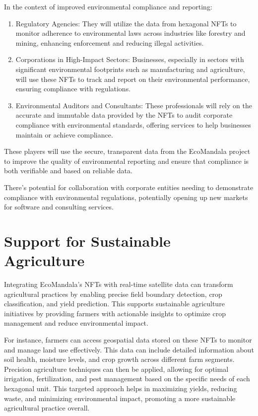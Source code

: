 \documentclass{scrreport}
\begin{document}
In the context of improved environmental compliance and reporting:
\begin{enumerate}
    \item Regulatory Agencies: They will utilize the data from hexagonal NFTs to monitor adherence to environmental laws across industries like forestry and mining, enhancing enforcement and reducing illegal activities.
    \item Corporations in High-Impact Sectors: Businesses, especially in sectors with significant environmental footprints such as manufacturing and agriculture, will use these NFTs to track and report on their environmental performance, ensuring compliance with regulations.
    \item Environmental Auditors and Consultants: These professionals will rely on the accurate and immutable data provided by the NFTs to audit corporate compliance with environmental standards, offering services to help businesses maintain or achieve compliance.
\end{enumerate}
These players will use the secure, transparent data from the EcoMandala project to improve the quality of environmental reporting and ensure that compliance is both verifiable and based on reliable data.

There's potential for collaboration with corporate entities needing to demonstrate compliance with environmental regulations, potentially opening up new markets for software and consulting services.

\section{Support for Sustainable Agriculture}

Integrating EcoMandala’s NFTs with real-time satellite data can transform agricultural practices by enabling precise field boundary detection, crop classification, and yield prediction. This supports sustainable agriculture initiatives by providing farmers with actionable insights to optimize crop management and reduce environmental impact.

For instance, farmers can access geospatial data stored on these NFTs to monitor and manage land use effectively. This data can include detailed information about soil health, moisture levels, and crop growth across different farm segments. Precision agriculture techniques can then be applied, allowing for optimal irrigation, fertilization, and pest management based on the specific needs of each hexagonal unit. This targeted approach helps in maximizing yields, reducing waste, and minimizing environmental impact, promoting a more sustainable agricultural practice overall.
\end{document}
